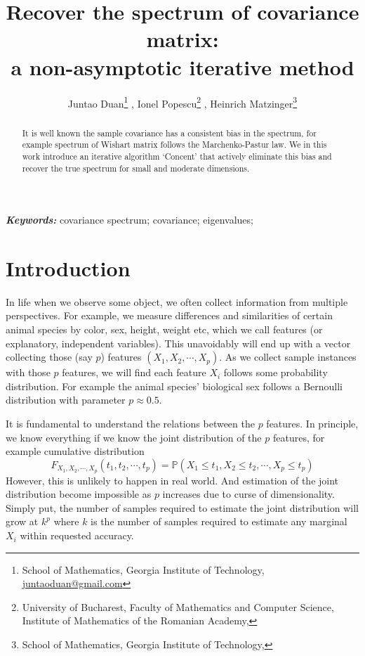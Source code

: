 \documentclass[12pt]{extarticle}
\title{Recover the spectrum of covariance matrix: \\  a non-asymptotic iterative method}
\author{Juntao Duan\footnote{School of Mathematics, Georgia Institute of Technology, 
    \href{mailto:juntaoduan@gmail.com}{juntaoduan@gmail.com}}
    ,\quad  
    Ionel Popescu\footnote{ University of Bucharest, Faculty of Mathematics and Computer Science, Institute of Mathematics of the Romanian Academy, %
    }
    ,\quad  
    Heinrich Matzinger\footnote{School of Mathematics, Georgia
 Institute of Technology, %
 }
    }
\newcommand{\field}[1]{\mathbb{#1}}
\newcommand{\1}{\field{1}}
\newcommand{\p}{\field{P}}
\numberwithin{equation}{section}
\providecommand{\keywords}[1]
{
  \small	
  \textbf{\textit{Keywords: }} #1
}
\begin{document}
\maketitle


\begin{abstract}
    It is well known the sample covariance has a consistent bias in the spectrum, for example spectrum of Wishart matrix follows the Marchenko-Pastur law. We in this work introduce an iterative algorithm `Concent' that actively eliminate this bias and recover the true spectrum for small and moderate dimensions.
\end{abstract}
\keywords{covariance spectrum; covariance; eigenvalues;} 



\section{Introduction}
In life when we observe some object, we often collect information from multiple perspectives. For example, we measure differences and similarities of certain animal species by color, sex, height, weight etc, which we call features (or explanatory, independent variables). This unavoidably will end up with a vector collecting those (say $p$) features $(X_1, X_2, \cdots, X_p)$. As we collect sample instances with those $p$ features, we will find each feature $X_i$ follows some probability distribution. For example the animal species' biological sex  follows a Bernoulli distribution with parameter $p\approx 0.5$.

It is fundamental to understand the relations between the $p$ features. In principle, we know everything if we know the joint distribution of the $p$ features, for example cumulative distribution \[
F_{X_1, X_2, \cdots, X_p}(t_1, t_2, \cdots, t_p) = \p(X_1 \le t_1, X_2\le t_2, \cdots, X_p\le t_p)
\]
However, this is unlikely to happen in real world. And estimation of the joint distribution become impossible as $p$ increases due to curse of dimensionality. Simply put, the number of samples required to estimate the joint distribution will grow at $k^p$ where $k$ is the number of samples required to estimate any marginal $X_i$ within requested accuracy.
\end{document}
